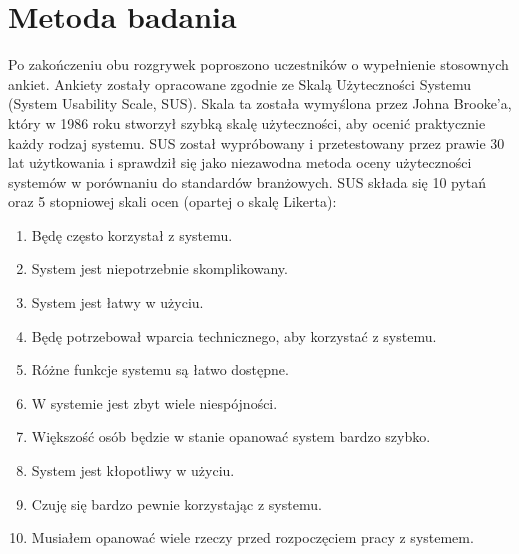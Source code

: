 \section{Metoda badania}
Po zakończeniu obu rozgrywek poproszono uczestników o wypełnienie stosownych ankiet.
Ankiety zostały opracowane zgodnie ze Skalą Użyteczności Systemu (System Usability Scale, SUS).
Skala ta została wymyślona przez Johna Brooke'a, który w 1986 roku stworzył szybką skalę użyteczności, aby
ocenić praktycznie każdy rodzaj systemu. \newline
SUS został wypróbowany i przetestowany przez prawie 30 lat użytkowania i sprawdził się jako
niezawodna metoda oceny użyteczności systemów w porównaniu do standardów branżowych. \newline
SUS składa się 10 pytań oraz 5 stopniowej skali ocen (opartej o skalę Likerta):
\begin{enumerate}
    \item Będę często korzystał z systemu.
    \item System jest niepotrzebnie skomplikowany.
    \item System jest łatwy w użyciu.
    \item Będę potrzebował wparcia technicznego, aby korzystać z systemu.
    \item Różne funkcje systemu są łatwo dostępne.
    \item W systemie jest zbyt wiele niespójności.
    \item Większość osób będzie w stanie opanować system bardzo szybko.
    \item System jest kłopotliwy w użyciu.
    \item Czuję się bardzo pewnie korzystając z systemu.
    \item Musiałem opanować wiele rzeczy przed rozpoczęciem pracy z systemem.
\end{enumerate}

